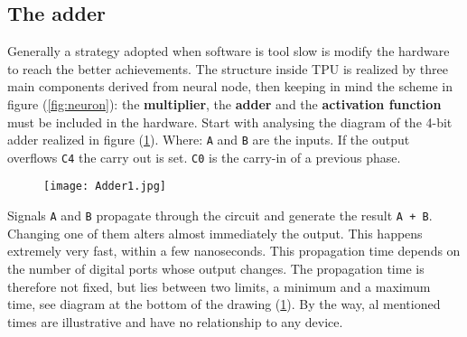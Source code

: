 \subsection{The adder}
\label{ssec:hard-adder}
Generally a strategy adopted when software is tool slow is modify the hardware
to reach the better achievements.
The structure inside TPU is realized by three main components derived from 
neural node, then keeping in mind the scheme in figure (\ref{fig:neuron}): the 
\textbf{multiplier}, the \textbf{adder} and the \textbf{activation function} 
must be included in the hardware.
Start with analysing the diagram of the 4-bit adder realized in figure
(\ref{fig:4-bit-adder}).\hfill \break
Where: \texttt{A} and \texttt{B} are the inputs. If the output overflows 
\texttt{C4} the carry out is set. \texttt{C0} is the carry-in of a previous 
phase.\cite{TPU:explained}
%
\begin{figure}[!h]
	\centering
	\texttt{[image: Adder1.jpg]}
	\label{fig:4-bit-adder}
\end{figure}
%
Signals \texttt{A} and \texttt{B} propagate through the circuit and generate the
result \texttt{A + B}. Changing one of them alters almost immediately the
output. This happens extremely very fast, within a few nanoseconds. This
propagation time depends on the number of digital ports whose output changes.
The propagation time is therefore not fixed, but lies between two limits, a
minimum and a maximum time, see diagram at the bottom of the drawing
(\ref{fig:4-bit-adder}). By the way, al mentioned times are illustrative and
have no relationship to any device.\cite{TPU:explained}
%
\newpage
